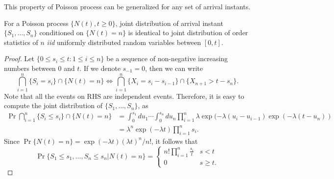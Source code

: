 \documentclass[a4paper,10pt]{article}
\begin{document}
This property of Poisson process can be generalized for any set of arrival instants.
\begin{prop} For a Poisson process $\{N(t), t\geqslant 0\}$, joint distribution of arrival instant $\{S_1, \ldots, S_n\}$ conditioned on $\{N(t)=n\}$ is identical to joint distribution of order statistics of $n$ \emph{iid} uniformly distributed random variables between $[0,t]$.
\end{prop}
\begin{proof} Let $\{ 0 \leq s_i \leq t: 1 \leqslant i \leqslant n\}$ be a sequence of non-negative increasing numbers between $0$ and $t$. If we denote $s_{-1} = 0$, then we can write 
\begin{equation*}
\bigcap_{i=1}^n\{S_i = s_i\}\cap\{N(t) = n\} \iff \bigcap_{i=1}^n\{X_i = s_i - s_{i-1}\}\cap\{X_{n+1} > t - s_n\}.
\end{equation*}
Note that all the events on RHS are independent events. Therefore, it is easy to compute the joint distribution of $\{S_1,\ldots, S_n\}$, as 
\begin{align*}
\Pr\bigcap_{i=1}^n\{S_i \leq s_i\}\cap\{N(t) = n\} &= \int_{0}^{s_1}du_1\cdots\int_{0}^{s_n}du_n \prod_{i=1}^n\lambda \exp(-\lambda (u_i-u_{i-1})\exp(-\lambda (t-u_n))\\
&= \lambda^n\exp(-\lambda t)\prod_{i=1}^ns_i.
\end{align*}
Since $\Pr\{N(t) = n\} = \exp(-\lambda t)(\lambda t)^n/n! $, it follows that 
\begin{equation*}
\Pr\{S_1 \leq s_1,\ldots, S_n\leq s_n | N(t) = n\} = 
\begin{cases}
n!\prod_{i=1}^n\frac{s_i}{t} & s < t\\ 
0 & s \geq t.
\end{cases}
\end{equation*}

\end{proof}
\end{document}
